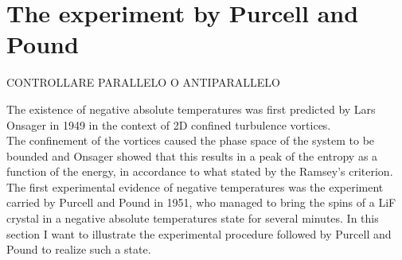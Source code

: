 \chapter{The experiment by Purcell and Pound}
\label{ch:PandP}

CONTROLLARE PARALLELO O ANTIPARALLELO

The existence of negative absolute temperatures was first predicted by Lars Onsager in 1949 \cite{Onsager} in the context of 2D confined turbulence vortices. \\
The confinement of the vortices caused the phase space of the system to be bounded and Onsager showed that this results in a peak of the entropy as a function of the energy, in accordance
to what stated by the Ramsey's criterion. \\
The first experimental evidence of negative temperatures was the experiment carried by Purcell and Pound \cite{PandP} in 1951, who managed to bring the spins of a LiF crystal in a negative absolute temperatures 
state for several minutes.
In this section I want to illustrate the experimental procedure followed by Purcell and Pound to realize such a state.\\

